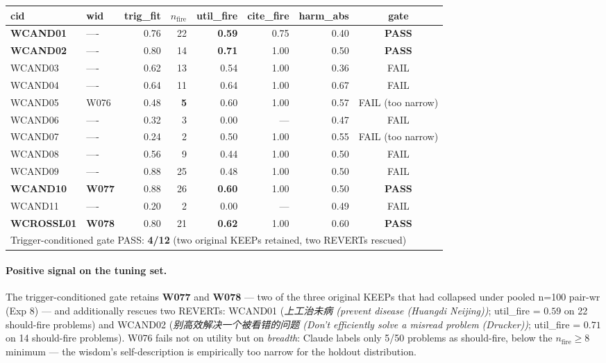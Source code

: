 \documentclass{article}
\begin{document}
\begin{CJK*}{UTF8}{gbsn}
\begin{center}\small
\begin{tabular}{l l r r r r r c}
  \toprule
  cid & wid & trig\_fit & \(n_{\text{fire}}\) & util\_fire
    & cite\_fire & harm\_abs & gate \\
  \midrule
  \textbf{WCAND01} & ---- & 0.76 & 22 & \textbf{0.59} & 0.75 & 0.40 & \textbf{PASS} \\
  \textbf{WCAND02} & ---- & 0.80 & 14 & \textbf{0.71} & 1.00 & 0.50 & \textbf{PASS} \\
  WCAND03 & ---- & 0.62 & 13 & 0.54 & 1.00 & 0.36 & FAIL \\
  WCAND04 & ---- & 0.64 & 11 & 0.64 & 1.00 & 0.67 & FAIL \\
  WCAND05 & W076 & 0.48 & \textbf{5} & 0.60 & 1.00 & 0.57 & FAIL (too narrow) \\
  WCAND06 & ---- & 0.32 & 3 & 0.00 & --- & 0.47 & FAIL \\
  WCAND07 & ---- & 0.24 & 2 & 0.50 & 1.00 & 0.55 & FAIL (too narrow) \\
  WCAND08 & ---- & 0.56 & 9 & 0.44 & 1.00 & 0.50 & FAIL \\
  WCAND09 & ---- & 0.88 & 25 & 0.48 & 1.00 & 0.50 & FAIL \\
  \textbf{WCAND10} & \textbf{W077} & 0.88 & 26 & \textbf{0.60} & 1.00 & 0.50 & \textbf{PASS} \\
  WCAND11 & ---- & 0.20 & 2 & 0.00 & --- & 0.49 & FAIL \\
  \textbf{WCROSSL01} & \textbf{W078} & 0.80 & 21 & \textbf{0.62} & 1.00 & 0.60 & \textbf{PASS} \\
  \midrule
  \multicolumn{8}{l}{Trigger-conditioned gate PASS: \textbf{4/12}
    (two original KEEPs retained, two REVERTs rescued)} \\
  \bottomrule
\end{tabular}
\end{center}

\paragraph{Positive signal on the tuning set.}
The trigger-conditioned gate retains \textbf{W077} and
\textbf{W078} — two of the three original KEEPs that had
collapsed under pooled n=100 pair-wr (Exp 8) — and additionally
rescues two REVERTs: WCAND01 (\emph{上工治未病 (\emph{prevent disease (Huangdi Neijing)})}; util\_fire =
\(0.59\) on 22 should-fire problems) and WCAND02
(\emph{别高效解决一个被看错的问题 (\emph{Don't efficiently solve a misread problem (Drucker)})}; util\_fire = \(0.71\) on
14 should-fire problems). W076 fails not on utility but on
\emph{breadth}: Claude labels only 5/50 problems as should-fire,
below the \(n_{\text{fire}} \geq 8\) minimum — the wisdom's
self-description is empirically too narrow for the holdout
distribution.


\end{CJK*}
\end{document}
